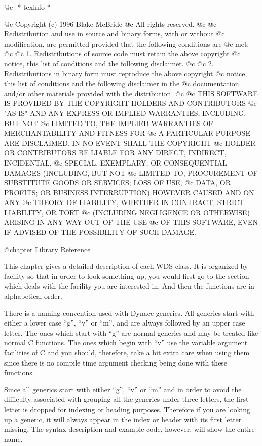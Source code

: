 @c -*-texinfo-*-

@c  Copyright (c) 1996 Blake McBride
@c  All rights reserved.
@c
@c  Redistribution and use in source and binary forms, with or without
@c  modification, are permitted provided that the following conditions are
@c  met:
@c
@c  1. Redistributions of source code must retain the above copyright
@c  notice, this list of conditions and the following disclaimer.
@c
@c  2. Redistributions in binary form must reproduce the above copyright
@c  notice, this list of conditions and the following disclaimer in the
@c  documentation and/or other materials provided with the distribution.
@c
@c  THIS SOFTWARE IS PROVIDED BY THE COPYRIGHT HOLDERS AND CONTRIBUTORS
@c  "AS IS" AND ANY EXPRESS OR IMPLIED WARRANTIES, INCLUDING, BUT NOT
@c  LIMITED TO, THE IMPLIED WARRANTIES OF MERCHANTABILITY AND FITNESS FOR
@c  A PARTICULAR PURPOSE ARE DISCLAIMED. IN NO EVENT SHALL THE COPYRIGHT
@c  HOLDER OR CONTRIBUTORS BE LIABLE FOR ANY DIRECT, INDIRECT, INCIDENTAL,
@c  SPECIAL, EXEMPLARY, OR CONSEQUENTIAL DAMAGES (INCLUDING, BUT NOT
@c  LIMITED TO, PROCUREMENT OF SUBSTITUTE GOODS OR SERVICES; LOSS OF USE,
@c  DATA, OR PROFITS; OR BUSINESS INTERRUPTION) HOWEVER CAUSED AND ON ANY
@c  THEORY OF LIABILITY, WHETHER IN CONTRACT, STRICT LIABILITY, OR TORT
@c  (INCLUDING NEGLIGENCE OR OTHERWISE) ARISING IN ANY WAY OUT OF THE USE
@c  OF THIS SOFTWARE, EVEN IF ADVISED OF THE POSSIBILITY OF SUCH DAMAGE.

@chapter Library Reference

This chapter gives a detailed description of each WDS class.  It is
organized by facility so that in order to look something up, you would
first go to the section which deals with the facility you are interested
in.  And then the functions are in alphabetical order.

There is a naming convention used with Dynace generics.  All generics
start with either a lower case ``g'', ``v'' or ``m'', and are always
followed by an upper case letter.  The ones which start with ``g'' are
normal generics and may be treated like normal C functions.  The ones
which begin with ``v'' use the variable argument facilities of C and
you should, therefore, take a bit extra care when using them since
there is no compile time argument checking being done with these functions.

Since all generics start with either ``g'', ``v'' or ``m'' and in order to
avoid the difficulty associated with grouping all the generics under
three letters, the first letter is dropped for indexing or heading
purposes.  Therefore if you are looking up a generic, it will always
appear in the index or header with its first letter missing.  The syntax
description and example code, however, will show the entire name.

